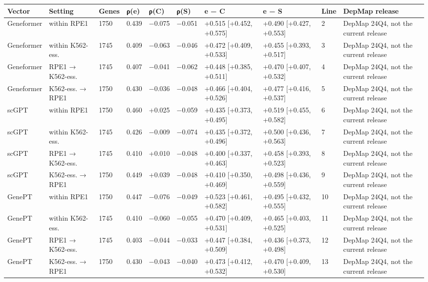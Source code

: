 \begin{tabular}{llllllllll}
\toprule
Vector & Setting & Genes & ρ(e) & ρ(C) & ρ(S) & e − C & e − S & Line & DepMap release \\
\midrule
Geneformer & within RPE1 & 1750 & 0.439 & −0.075 & −0.051 & +0.515 [+0.452, +0.575] & +0.490 [+0.427, +0.553] & 2 & DepMap 24Q4, not the current release \\
Geneformer & within K562-ess. & 1745 & 0.409 & −0.063 & −0.046 & +0.472 [+0.409, +0.533] & +0.455 [+0.393, +0.517] & 3 & DepMap 24Q4, not the current release \\
Geneformer & RPE1 → K562-ess. & 1745 & 0.407 & −0.041 & −0.062 & +0.448 [+0.385, +0.511] & +0.470 [+0.407, +0.532] & 4 & DepMap 24Q4, not the current release \\
Geneformer & K562-ess. → RPE1 & 1750 & 0.430 & −0.036 & −0.048 & +0.466 [+0.404, +0.526] & +0.477 [+0.416, +0.537] & 5 & DepMap 24Q4, not the current release \\
scGPT & within RPE1 & 1750 & 0.460 & +0.025 & −0.059 & +0.435 [+0.373, +0.495] & +0.519 [+0.455, +0.582] & 6 & DepMap 24Q4, not the current release \\
scGPT & within K562-ess. & 1745 & 0.426 & −0.009 & −0.074 & +0.435 [+0.372, +0.496] & +0.500 [+0.436, +0.563] & 7 & DepMap 24Q4, not the current release \\
scGPT & RPE1 → K562-ess. & 1745 & 0.410 & +0.010 & −0.048 & +0.400 [+0.337, +0.463] & +0.458 [+0.393, +0.523] & 8 & DepMap 24Q4, not the current release \\
scGPT & K562-ess. → RPE1 & 1750 & 0.449 & +0.039 & −0.048 & +0.410 [+0.350, +0.469] & +0.498 [+0.436, +0.559] & 9 & DepMap 24Q4, not the current release \\
GenePT & within RPE1 & 1750 & 0.447 & −0.076 & −0.049 & +0.523 [+0.461, +0.582] & +0.495 [+0.432, +0.555] & 10 & DepMap 24Q4, not the current release \\
GenePT & within K562-ess. & 1745 & 0.410 & −0.060 & −0.055 & +0.470 [+0.409, +0.531] & +0.465 [+0.403, +0.525] & 11 & DepMap 24Q4, not the current release \\
GenePT & RPE1 → K562-ess. & 1745 & 0.403 & −0.044 & −0.033 & +0.447 [+0.384, +0.509] & +0.436 [+0.373, +0.498] & 12 & DepMap 24Q4, not the current release \\
GenePT & K562-ess. → RPE1 & 1750 & 0.430 & −0.043 & −0.040 & +0.473 [+0.412, +0.532] & +0.470 [+0.409, +0.530] & 13 & DepMap 24Q4, not the current release \\
\bottomrule
\end{tabular}
